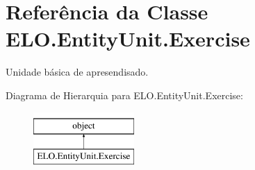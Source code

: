 \hypertarget{classELO_1_1EntityUnit_1_1Exercise}{\section{Referência da Classe E\-L\-O.\-Entity\-Unit.\-Exercise}
\label{classELO_1_1EntityUnit_1_1Exercise}
}


Unidade básica de apresendisado.  


Diagrama de Hierarquia para E\-L\-O.\-Entity\-Unit.\-Exercise\-:\begin{figure}[H]
\begin{center}
\leavevmode
\includegraphics[height=2.000000cm]{d5/d6a/classELO_1_1EntityUnit_1_1Exercise}
\end{center}
\end{figure}
